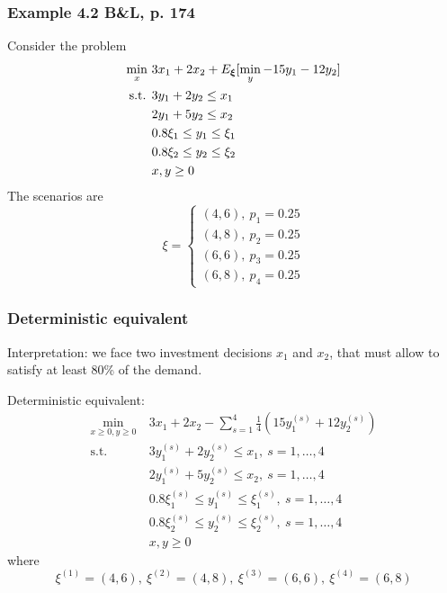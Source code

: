 \documentclass{beamer}
\begin{document}
\begin{frame}
\frametitle{Example 4.2 B\&L, p. 174}

Consider the problem
\begin{align*}
	\min_x\ & 3x_1 + 2x_2 + E_{{\boldsymbol{\xi}}}[\min_y -15y_1-12y_2] \\
	\mbox{s.t. } & 3y_1 + 2y_2 \leq x_1 \\
	& 2y_1 + 5y_2 \leq x_2 \\
	& 0.8 \xi_1 \leq y_1 \leq \xi_1 \\
	& 0.8 \xi_2 \leq y_2 \leq \xi_2 \\
	& x, y \geq 0
\end{align*}
The scenarios are
\[
\xi =
\begin{cases}
(4,6),\ p_1 = 0.25 \\
(4,8),\ p_2 = 0.25 \\
(6,6),\ p_3 = 0.25 \\
(6,8),\ p_4 = 0.25
\end{cases}
\]

\end{frame}

\begin{frame}
\frametitle{Deterministic equivalent}

{\red Interpretation}: we face two investment decisions $x_1$ and $x_2$,
that must allow to satisfy at least 80\% of the demand.

{\red Deterministic equivalent}:
\begin{align*}
\min_{x \geq 0, y \geq 0}\ & 3x_1 + 2x_2 - \sum_{s = 1}^4 \frac{1}{4} \left( 15y^{(s)}_1+12y^{(s)}_2 \right) \\
\mbox{s.t. } & 3y^{(s)}_1 + 2y^{(s)}_2 \leq x_1,\ s = 1,\ldots,4 \\
& 2y^{(s)}_1 + 5y^{(s)}_2 \leq x_2,\ s = 1,\ldots,4 \\
& 0.8 \xi^{(s)}_1 \leq y^{(s)}_1 \leq \xi^{(s)}_1,\ s = 1,\ldots,4 \\
& 0.8 \xi^{(s)}_2 \leq y^{(s)}_2 \leq \xi^{(s)}_2,\ s = 1,\ldots,4 \\
& x, y \geq 0
\end{align*}
where
$$
\xi^{(1)} = (4,6),\ 
\xi^{(2)} = (4,8), \
\xi^{(3)} = (6,6),\ 
\xi^{(4)} = (6,8)
$$

\end{frame}
\end{document}

